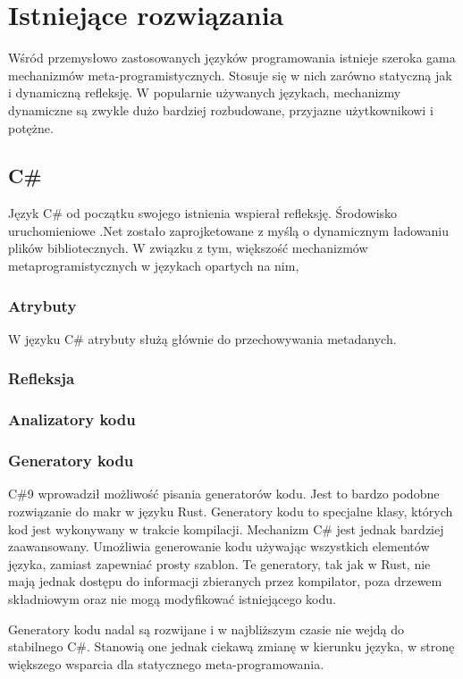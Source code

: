 \section{Istniejące rozwiązania}
Wśród przemysłowo zastosowanych języków programowania istnieje szeroka gama mechanizmów meta-programistycznych. Stosuje się w nich zarówno statyczną jak i dynamiczną refleksję. W popularnie używanych językach, mechanizmy dynamiczne są zwykle dużo bardziej rozbudowane, przyjazne użytkownikowi i potężne.

\subsection{C\#}
Język C\# od początku swojego istnienia wspierał refleksję.
Środowisko uruchomieniowe .Net zostało zaprojketowane z myślą o dynamicznym ładowaniu plików bibliotecznych.
W związku z tym, większość mechanizmów metaprogramistycznych w językach opartych na nim, 
\subsubsection{Atrybuty}
W języku C\# atrybuty służą głównie do przechowywania metadanych.
\subsubsection{Refleksja}
\subsubsection{Analizatory kodu}
\subsubsection{Generatory kodu}
C\#9 wprowadził możliwość pisania generatorów kodu. Jest to bardzo podobne rozwiązanie do makr w języku Rust. Generatory kodu to specjalne klasy, których kod jest wykonywany w trakcie kompilacji. 
Mechanizm C\# jest jednak bardziej zaawansowany. Umożliwia generowanie kodu używając wszystkich elementów języka, zamiast zapewniać prosty szablon. Te generatory, tak jak w Rust, nie mają jednak dostępu do informacji zbieranych przez kompilator, poza drzewem składniowym oraz nie mogą modyfikować istniejącego kodu.\par
Generatory kodu nadal są rozwijane i w najbliższym czasie nie wejdą do stabilnego C\#. Stanowią one jednak ciekawą zmianę w kierunku języka, w stronę większego wsparcia dla statycznego meta-programowania.
